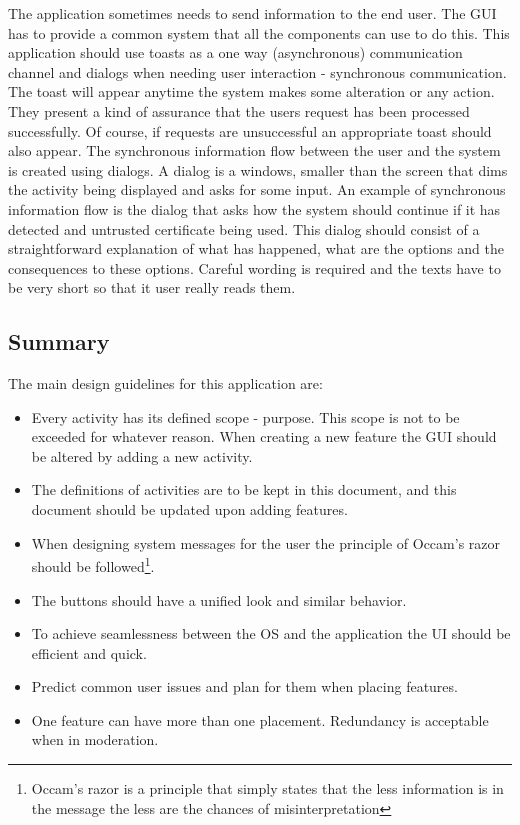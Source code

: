\documentclass[11pt]{article} %
\begin{document}
The application sometimes needs to send information to the end user. The GUI has to provide a common system that all the components can use to do this. This application should use toasts as a one way (asynchronous) communication channel and dialogs when needing user interaction - synchronous communication. The toast will appear anytime the system makes some alteration or any action. They present a kind of assurance that the users request has been processed successfully. Of course, if requests are unsuccessful an appropriate toast should also appear. The synchronous information flow between the user and the system is created using dialogs. A dialog is a windows, smaller than the screen that dims the activity being displayed and asks for some input. An example of synchronous information flow is the dialog that asks how the system should continue if it has detected and untrusted certificate being used. This dialog should consist of a straightforward explanation of what has happened, what are the options and the consequences to these options. Careful wording is required and the texts have to be very short so that it user really reads them. 

\subsection{Summary}
The main design guidelines for this application are:
\begin{itemize}
\item Every activity has its defined scope - purpose. This scope is not to be exceeded for whatever reason. When creating a new feature the GUI should be altered by adding a new activity.
\item The definitions of activities are to be kept in this document, and this document should be updated upon adding features.
\item When designing system messages for the user the principle of Occam's razor should be followed\footnote{Occam's razor is a principle that simply states that the less information is in the message the less are the chances of misinterpretation}. 
\item The buttons should have a unified look and similar behavior.
\item To achieve seamlessness between the OS and the application the UI should be efficient and quick.
\item Predict common user issues and plan for them when placing features.
\item One feature can have more than one placement. Redundancy is acceptable when in moderation.
\end{itemize}
\end{document}
